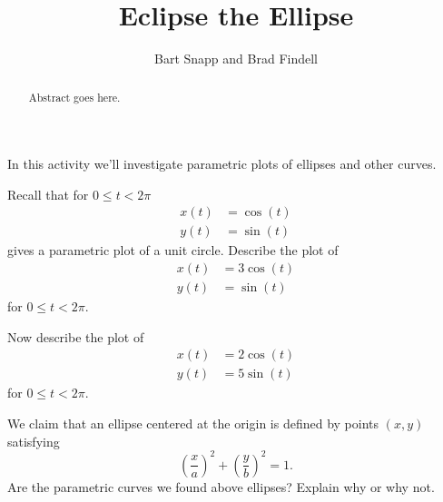 \documentclass{ximera}
\title{Eclipse the Ellipse}
\author{Bart Snapp and Brad Findell}
\begin{document}
\begin{abstract}
Abstract goes here.  
\end{abstract}
\maketitle

In this activity we'll investigate parametric plots of ellipses and
other curves.

\begin{problem} 
Recall that for $0\le t<2\pi$ 
\begin{align*}
x(t) &= \cos(t)\\ 
y(t) &= \sin(t)
\end{align*}
gives a parametric plot of a unit circle. Describe the plot of
\begin{align*}
x(t) &= 3\cos(t)\\ 
y(t) &= \sin(t)
\end{align*}
for $0\le t<2\pi$.
\end{problem} 

\begin{problem}
Now describe the plot of 
\begin{align*}
x(t) &= 2\cos(t)\\ 
y(t) &= 5\sin(t)
\end{align*}
for $0\le t<2\pi$.
\end{problem}

\begin{problem}
We claim that an ellipse centered at the origin is defined by points
$(x,y)$ satisfying
\[
\left(\frac{x}{a}\right)^2 + \left(\frac{y}{b}\right)^2 = 1.
\]
Are the parametric curves we found above ellipses? Explain why or why
not. 
\end{problem}

\newpage
\end{document}
